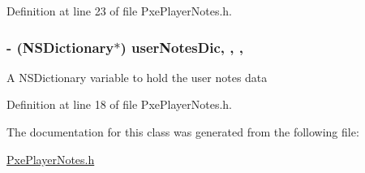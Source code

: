 Definition at line 23 of file Pxe\-Player\-Notes.\-h.

\hypertarget{interface_pxe_player_notes_a8c454cc9d07d5e77e226f9eb29728a91}{
\subsubsection[{user\-Notes\-Dic}]{\setlength{\rightskip}{0pt plus 5cm}-\/ (N\-S\-Dictionary$\ast$) user\-Notes\-Dic\hspace{0.3cm}{\ttfamily [read]}, {\ttfamily [write]}, {\ttfamily [nonatomic]}, {\ttfamily [strong]}}}\label{interface_pxe_player_notes_a8c454cc9d07d5e77e226f9eb29728a91}
A N\-S\-Dictionary variable to hold the user notes data 

Definition at line 18 of file Pxe\-Player\-Notes.\-h.



The documentation for this class was generated from the following file\-:\begin{DoxyCompactItemize}
\item 
\hyperlink{_pxe_player_notes_8h}{Pxe\-Player\-Notes.\-h}\end{DoxyCompactItemize}
